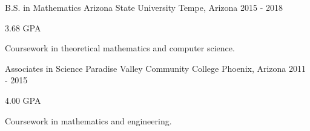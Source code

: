 

\begin{cventries}

  \cventry
    {B.S. in Mathematics} %
    {Arizona State University} %
    {Tempe, Arizona} %
    {2015 - 2018} %
    {
      \begin{cvitems} %
        \item {3.68 GPA}
        \item {Coursework in theoretical mathematics and computer science.}
      \end{cvitems}
    }
  \cventry
    {Associates in Science} %
    {Paradise Valley Community College} %
    {Phoenix, Arizona} %
    {2011 - 2015} %
    {
      \begin{cvitems} %
        \item {4.00 GPA}
        \item {Coursework in mathematics and engineering.}
      \end{cvitems}
    }

\end{cventries}
